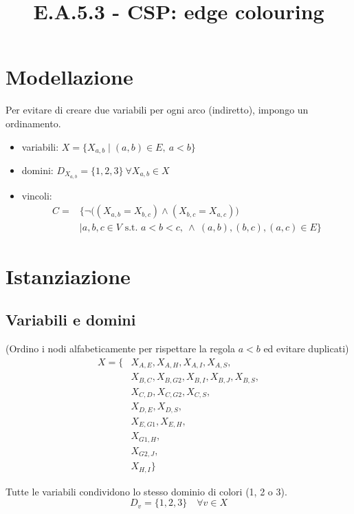 \documentclass[12pt]{article}
\title{E.A.5.3 - CSP: edge colouring}
\author{}
\date{}
\begin{document}
\maketitle
\vspace{-5em}
\section{Modellazione}

Per evitare di creare due variabili per ogni arco (indiretto), impongo un ordinamento.

\begin{itemize}
    \item variabili: $X = \{ X_{a, b} \mid (a,b)\in E, \ a < b \}$
    \item domini: $D_{X_{a,b}} = \{1, 2, 3\} \ \forall X_{a,b}\in X$
    \item vincoli: 
        \begin{align*}
            C = &\{\neg\bigl( (X_{a,b} = X_{b,c}) \land (X_{b,c} = X_{a,c})\bigr) \\
                &\mid a, b, c \in V \text{ s.t. } a < b < c, \ \land \  (a,b), (b,c), (a,c) \in E\} 
        \end{align*}
\end{itemize}

\section{Istanziazione}

\subsection{Variabili e domini}
(Ordino i nodi alfabeticamente per rispettare la regola $a < b$ ed evitare duplicati)
\begin{align*}
X = \{ & X_{A,E}, X_{A,H}, X_{A,I}, X_{A,S}, \\
& X_{B,C}, X_{B,G2}, X_{B,I}, X_{B,J}, X_{B,S}, \\
& X_{C,D}, X_{C,G2}, X_{C,S}, \\
& X_{D,E}, X_{D,S}, \\
& X_{E,G1}, X_{E,H}, \\
& X_{G1,H}, \\
& X_{G2,J}, \\
& X_{H,I} \}
\end{align*}

Tutte le variabili condividono lo stesso dominio di colori (1, 2 o 3).
\[
D_v = \{1, 2, 3\} \quad \forall v \in X
\]
\end{document}
